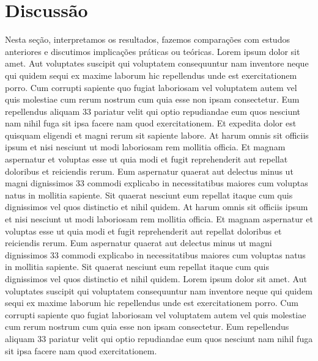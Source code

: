 \documentclass[12pt]{article}
\begin{document}
\section{Discussão} %
Nesta seção, interpretamos os resultados, fazemos comparações com estudos anteriores e discutimos implicações práticas ou teóricas. Lorem ipsum dolor sit amet. Aut voluptates suscipit qui voluptatem consequuntur nam inventore neque qui quidem sequi ex maxime laborum hic repellendus unde est exercitationem porro. Cum corrupti sapiente quo fugiat laboriosam vel voluptatem autem vel quis molestiae cum rerum nostrum cum quia esse non ipsam consectetur. Eum repellendus aliquam 33 pariatur velit qui optio repudiandae eum quos nesciunt nam nihil fuga sit ipsa facere nam quod exercitationem. Et expedita dolor est quisquam eligendi et magni rerum sit sapiente labore. At harum omnis sit officiis ipsum et nisi nesciunt ut modi laboriosam rem mollitia officia. Et magnam aspernatur et voluptas esse ut quia modi et fugit reprehenderit aut repellat doloribus et reiciendis rerum. Eum aspernatur quaerat aut delectus minus ut magni dignissimos 33 commodi explicabo in necessitatibus maiores cum voluptas natus in mollitia sapiente. Sit quaerat nesciunt eum repellat itaque cum quis dignissimos vel quos distinctio et nihil quidem.  At harum omnis sit officiis ipsum et nisi nesciunt ut modi laboriosam rem mollitia officia. Et magnam aspernatur et voluptas esse ut quia modi et fugit reprehenderit aut repellat doloribus et reiciendis rerum. Eum aspernatur quaerat aut delectus minus ut magni dignissimos 33 commodi explicabo in necessitatibus maiores cum voluptas natus in mollitia sapiente. Sit quaerat nesciunt eum repellat itaque cum quis dignissimos vel quos distinctio et nihil quidem. 
Lorem ipsum dolor sit amet. Aut voluptates suscipit qui voluptatem consequuntur nam inventore neque qui quidem sequi ex maxime laborum hic repellendus unde est exercitationem porro. Cum corrupti sapiente quo fugiat laboriosam vel voluptatem autem vel quis molestiae cum rerum nostrum cum quia esse non ipsam consectetur. Eum repellendus aliquam 33 pariatur velit qui optio repudiandae eum quos nesciunt nam nihil fuga sit ipsa facere nam quod exercitationem. 
\end{document}
